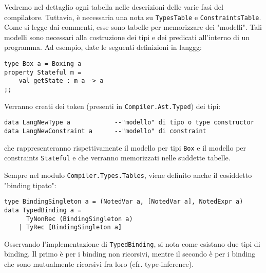 \documentclass[10pt,a4paper]{article}
\begin{document}
Vedremo nel dettaglio ogni tabella nelle descrizioni delle varie fasi del compilatore. Tuttavia, è necessaria una nota
su \texttt{TypesTable} e \texttt{ConstraintsTable}. Come si legge dai commenti, esse sono tabelle per memorizzare dei
"modelli". Tali modelli sono necessari alla costruzione dei tipi e dei predicati all'interno di un programma. Ad esempio,
date le seguenti definizioni in langgg:
\begin{lstlisting}
type Box a = Boxing a
property Stateful m =
    val getState : m a -> a
;;
\end{lstlisting}
Verranno creati dei token (presenti in \texttt{Compiler.Ast.Typed}) dei tipi:
\begin{lstlisting}
data LangNewType a            --"modello" di tipo o type constructor
data LangNewConstraint a      --"modello" di constraint
\end{lstlisting}
che rappresenteranno rispettivamente il modello per tipi \texttt{Box} e il modello per constraints \texttt{Stateful} e che
verranno memorizzati nelle suddette tabelle.

Sempre nel modulo \texttt{Compiler.Types.Tables}, viene definito anche il cosiddetto "binding tipato":
\begin{lstlisting}
type BindingSingleton a = (NotedVar a, [NotedVar a], NotedExpr a)
data TypedBinding a =
      TyNonRec (BindingSingleton a)
    | TyRec [BindingSingleton a]
\end{lstlisting}
Osservando l'implementazione di \texttt{TypedBinding}, si nota come esistano due tipi di binding. Il primo è per i binding
non ricorsivi, mentre il secondo è per i binding che sono mutualmente ricorsivi fra loro (cfr. type-inference).
\end{document}
